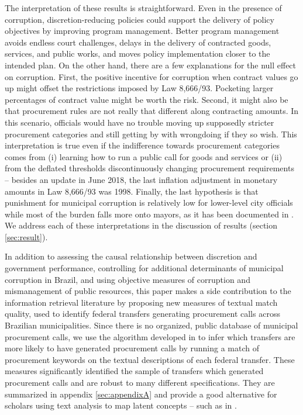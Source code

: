 \documentclass[11pt]{article}
\begin{document}
The interpretation of these results is straightforward. Even in the presence of corruption, discretion-reducing policies could support the delivery of policy objectives by improving program management. Better program management avoids endless court challenges, delays in the delivery of contracted goods, services, and public works, and moves policy implementation closer to the intended plan. On the other hand, there are a few explanations for the null effect on corruption. First, the positive incentive for corruption when contract values go up might offset the restrictions imposed by Law 8,666/93. Pocketing larger percentages of contract value might be worth the risk. Second, it might also be that procurement rules are not really that different along contracting amounts. In this scenario, officials would have no trouble moving up supposedly stricter procurement categories and still getting by with wrongdoing if they so wish. This interpretation is true even if the indifference towards procurement categories comes from (i) learning how to run a public call for goods and services or (ii) from the deflated thresholds discontinuously changing procurement requirements -- besides an update in June 2018, the last inflation adjustment in monetary amounts in Law 8,666/93 was 1998. Finally, the last hypothesis is that punishment for municipal corruption is relatively low for lower-level city officials while most of the burden falls more onto mayors, as it has been documented in \citet{FinanGovernmentAuditsReduce2018}. We address each of these interpretations in the discussion of results (section \ref{sec:result}).

In addition to assessing the causal relationship between discretion and government performance, controlling for additional determinants of municipal corruption in Brazil, and using objective measures of corruption and mismanagement of public resources, this paper makes a side contribution to the information retrieval literature by proposing new measures of textual match quality, used to identify federal transfers generating procurement calls across Brazilian municipalities. Since there is no organized, public database of municipal procurement calls, we use the algorithm developed in \citet{AssumpcaotextfindDataDrivenText2018} to infer which transfers are more likely to have generated procurement calls by running a match of procurement keywords on the textual descriptions of each federal transfer. These measures significantly identified the sample of transfers which generated procurement calls and are robust to many different specifications. They are summarized in appendix \ref{sec:appendixA} and provide a good alternative for scholars using text analysis to map latent concepts -- such as in \citet{LichandCorruptionGoodYour2017}.
\end{document}
